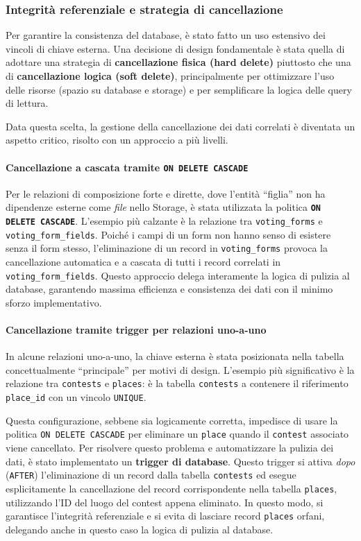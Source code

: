 \subsubsection{Integrità referenziale e strategia di cancellazione}
Per garantire la consistenza del database, è stato fatto un uso estensivo dei vincoli di chiave esterna.
Una decisione di design fondamentale è stata quella di adottare una strategia di \textbf{cancellazione fisica (hard delete)} piuttosto che una di \textbf{cancellazione logica (soft delete)}, principalmente per ottimizzare l'uso delle risorse (spazio su database e storage) e per semplificare la logica delle query di lettura.

Data questa scelta, la gestione della cancellazione dei dati correlati è diventata un aspetto critico, risolto con un approccio a più livelli.

\paragraph{Cancellazione a cascata tramite \texttt{ON DELETE CASCADE}}
Per le relazioni di composizione forte e dirette, dove l'entità ``figlia'' non ha dipendenze esterne come \emph{file} nello Storage, è stata utilizzata la politica \textbf{\texttt{ON DELETE CASCADE}}.
L'esempio più calzante è la relazione tra \texttt{voting\_forms} e \texttt{voting\_form\_fields}.
Poiché i campi di un form non hanno senso di esistere senza il form stesso, l'eliminazione di un record in \texttt{voting\_forms} provoca la cancellazione automatica e a cascata di tutti i record correlati in \texttt{voting\_form\_fields}.
Questo approccio delega interamente la logica di pulizia al database, garantendo massima efficienza e consistenza dei dati con il minimo sforzo implementativo.

\paragraph{Cancellazione tramite trigger per relazioni uno-a-uno}
In alcune relazioni uno-a-uno, la chiave esterna è stata posizionata nella tabella concettualmente ``principale'' per motivi di design.
L'esempio più significativo è la relazione tra \texttt{contests} e \texttt{places}: è la tabella \texttt{contests} a contenere il riferimento \texttt{place\_id} con un vincolo \texttt{UNIQUE}.

Questa configurazione, sebbene sia logicamente corretta, impedisce di usare la politica \texttt{ON DELETE CASCADE} per eliminare un \texttt{place} quando il \texttt{contest} associato viene cancellato.
Per risolvere questo problema e automatizzare la pulizia dei dati, è stato implementato un \textbf{trigger di database}.
Questo trigger si attiva \emph{dopo} (\texttt{AFTER}) l'eliminazione di un record dalla tabella \texttt{contests} ed esegue esplicitamente la cancellazione del record corrispondente nella tabella \texttt{places}, utilizzando l'ID del luogo del contest appena eliminato.
In questo modo, si garantisce l'integrità referenziale e si evita di lasciare record \texttt{places} orfani, delegando anche in questo caso la logica di pulizia al database.

